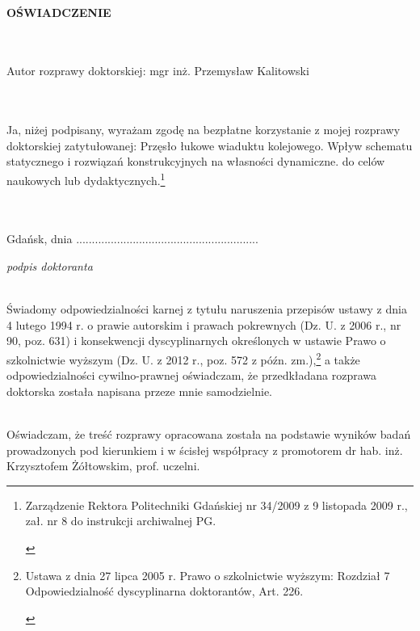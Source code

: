 \begin{figure}
	 \hfill
	
\end{figure}


\begin{myfont}
	
	\noindent
	\\ 
	\textbf{OŚWIADCZENIE}
	
	\footnotesize
	\noindent
	\\ \\
	Autor rozprawy doktorskiej: mgr inż. Przemysław Kalitowski
	
	\noindent
	\\ \\
	Ja, niżej podpisany, wyrażam zgodę na bezpłatne korzystanie z mojej rozprawy doktorskiej zatytułowanej: 
	Przęsło łukowe wiaduktu kolejowego. Wpływ schematu statycznego i rozwiązań konstrukcyjnych na własności dynamiczne.
	\noindent
	do celów naukowych lub dydaktycznych.\footnote{\begin{myfont}\scriptsize 
			Zarządzenie Rektora Politechniki Gdańskiej nr 34/2009 z 9 listopada 2009 r., zał. nr 8 do instrukcji archiwalnej PG.\end{myfont}}
	
	\noindent
	\\ \\
	Gdańsk, dnia .............................\hfill.............................
	
	\scriptsize \noindent
	\null\hfill \textit{podpis doktoranta}
	
	
	\footnotesize \noindent
	\\
	Świadomy odpowiedzialności karnej z tytułu naruszenia przepisów ustawy z dnia 4 lutego 1994 r. o prawie autorskim i prawach pokrewnych (Dz. U. z 2006 r., nr 90, poz. 631) i konsekwencji dyscyplinarnych określonych w ustawie Prawo o szkolnictwie wyższym (Dz. U. z 2012 r., poz. 572 z późn. zm.),\footnote{\begin{myfont}\scriptsize Ustawa z dnia 27 lipca 2005 r. Prawo o szkolnictwie wyższym: Rozdział 7 Odpowiedzialność dyscyplinarna doktorantów, Art. 226.
	\end{myfont}}
	a także odpowiedzialności cywilno-prawnej oświadczam, że przedkładana rozprawa doktorska została napisana przeze mnie samodzielnie.
	
	\footnotesize \noindent
	\\
	Oświadczam, że treść rozprawy opracowana została na podstawie wyników badań prowadzonych pod kierunkiem i w ścisłej współpracy z promotorem dr hab. inż. Krzysztofem Żółtowskim, prof. uczelni.
	

\end{myfont}
